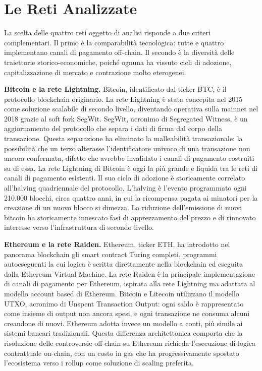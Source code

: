 \documentclass[12pt,a4paper,oneside]{book}
\begin{document}
\section{Le Reti Analizzate}

La scelta delle quattro reti oggetto di analisi risponde a due criteri complementari. Il primo è la comparabilità tecnologica: tutte e quattro implementano canali di pagamento off-chain. Il secondo è la diversità delle traiettorie storico-economiche, poiché ognuna ha vissuto cicli di adozione, capitalizzazione di mercato e contrazione molto eterogenei.

\textbf{Bitcoin e la rete Lightning.} Bitcoin, identificato dal ticker BTC, è il protocollo blockchain originario. La rete Lightning è stata concepita nel 2015 come soluzione scalabile di secondo livello, diventando operativa sulla mainnet nel 2018 grazie al soft fork SegWit. SegWit, acronimo di Segregated Witness, è un aggiornamento del protocollo che separa i dati di firma dal corpo della transazione. Questa separazione ha eliminato la malleabilità transazionale: la possibilità che un terzo alterasse l'identificatore univoco di una transazione non ancora confermata, difetto che avrebbe invalidato i canali di pagamento costruiti su di essa. La rete Lightning di Bitcoin è oggi la più grande e liquida tra le reti di canali di pagamento esistenti. Il suo ciclo di adozione è storicamente correlato all'halving quadriennale del protocollo. L'halving è l'evento programmato ogni 210.000 blocchi, circa quattro anni, in cui la ricompensa pagata ai minatori per la creazione di un nuovo blocco si dimezza. La riduzione dell'emissione di nuovi bitcoin ha storicamente innescato fasi di apprezzamento del prezzo e di rinnovato interesse verso l'infrastruttura di secondo livello.

\textbf{Ethereum e la rete Raiden.} Ethereum, ticker ETH, ha introdotto nel panorama blockchain gli smart contract Turing completi, programmi autoeseguenti la cui logica è scritta direttamente nella blockchain ed eseguita dalla Ethereum Virtual Machine. La rete Raiden è la principale implementazione di canali di pagamento per Ethereum, ispirata alla rete Lightning ma adattata al modello account based di Ethereum. Bitcoin e Litecoin utilizzano il modello UTXO, acronimo di Unspent Transaction Output: ogni saldo è rappresentato come insieme di output non ancora spesi, e ogni transazione ne consuma alcuni creandone di nuovi. Ethereum adotta invece un modello a conti, più simile ai sistemi bancari tradizionali. Questa differenza architettonica comporta che la risoluzione delle controversie off-chain su Ethereum richieda l'esecuzione di logica contrattuale on-chain, con un costo in gas che ha progressivamente spostato l'ecosistema verso i rollup come soluzione di scaling preferita.
\end{document}
